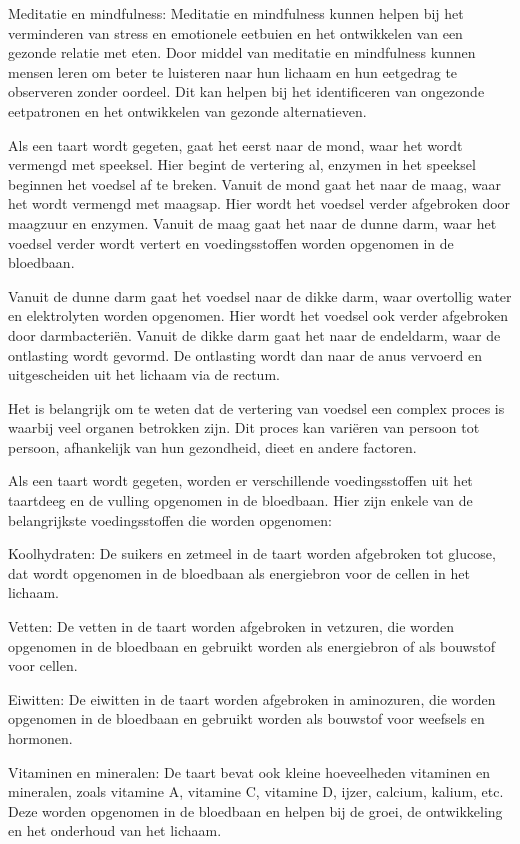 Meditatie en mindfulness: Meditatie en mindfulness kunnen helpen bij het verminderen van stress en emotionele eetbuien en het ontwikkelen van een gezonde relatie met eten. Door middel van meditatie en mindfulness kunnen mensen leren om beter te luisteren naar hun lichaam en hun eetgedrag te observeren zonder oordeel. Dit kan helpen bij het identificeren van ongezonde eetpatronen en het ontwikkelen van gezonde alternatieven.

Als een taart wordt gegeten, gaat het eerst naar de mond, waar het wordt vermengd met speeksel. Hier begint de vertering al, enzymen in het speeksel beginnen het voedsel af te breken. Vanuit de mond gaat het naar de maag, waar het wordt vermengd met maagsap. Hier wordt het voedsel verder afgebroken door maagzuur en enzymen. Vanuit de maag gaat het naar de dunne darm, waar het voedsel verder wordt vertert en voedingsstoffen worden opgenomen in de bloedbaan.

Vanuit de dunne darm gaat het voedsel naar de dikke darm, waar overtollig water en elektrolyten worden opgenomen. Hier wordt het voedsel ook verder afgebroken door darmbacteriën. Vanuit de dikke darm gaat het naar de endeldarm, waar de ontlasting wordt gevormd. De ontlasting wordt dan naar de anus vervoerd en uitgescheiden uit het lichaam via de rectum.

Het is belangrijk om te weten dat de vertering van voedsel een complex proces is waarbij veel organen betrokken zijn. Dit proces kan variëren van persoon tot persoon, afhankelijk van hun gezondheid, dieet en andere factoren.

Als een taart wordt gegeten, worden er verschillende voedingsstoffen uit het taartdeeg en de vulling opgenomen in de bloedbaan. Hier zijn enkele van de belangrijkste voedingsstoffen die worden opgenomen:

Koolhydraten: De suikers en zetmeel in de taart worden afgebroken tot glucose, dat wordt opgenomen in de bloedbaan als energiebron voor de cellen in het lichaam.

Vetten: De vetten in de taart worden afgebroken in vetzuren, die worden opgenomen in de bloedbaan en gebruikt worden als energiebron of als bouwstof voor cellen.

Eiwitten: De eiwitten in de taart worden afgebroken in aminozuren, die worden opgenomen in de bloedbaan en gebruikt worden als bouwstof voor weefsels en hormonen.

Vitaminen en mineralen: De taart bevat ook kleine hoeveelheden vitaminen en mineralen, zoals vitamine A, vitamine C, vitamine D, ijzer, calcium, kalium, etc. Deze worden opgenomen in de bloedbaan en helpen bij de groei, de ontwikkeling en het onderhoud van het lichaam.

